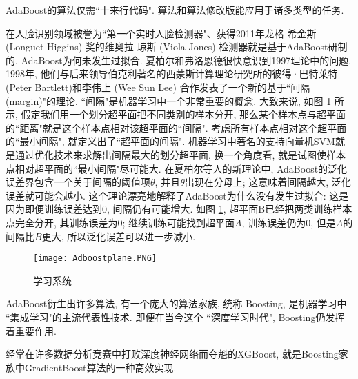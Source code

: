 AdaBoost的算法仅需“十来行代码". 算法和算法修改版能应用于诸多类型的任务.
\begin{example}
在人脸识别领域被誉为“第一个实时人脸检测器"、获得2011年龙格-希金斯 (Longuet-Higgins) 奖的维奥拉-琼斯 (Viola-Jones) 检测器就是基于AdaBoost研制的, AdaBoost为何未发生过拟合. 
夏柏尔和弗洛恩德很快意识到1997理论中的问题. 1998年, 他们与后来领导伯克利著名的西蒙斯计算理论研究所的彼得·巴特莱特 (Peter Bartlett)和李伟上 (Wee Sun Lee) 合作发表了一个新的基于“间隔 (margin)"的理论.
“间隔"是机器学习中一个非常重要的概念. 大致来说, 如图 \ref{AI32Adboostplane} 所示, 假定我们用一个划分超平面把不同类别的样本分开, 那么某个样本点与超平面的“距离"就是这个样本点相对该超平面的“间隔".
考虑所有样本点相对这个超平面的“最小间隔", 就定义出了“超平面的间隔".
机器学习中著名的支持向量机SVM就是通过优化技术来求解出间隔最大的划分超平面, 换一个角度看, 就是试图使样本点相对超平面的“最小间隔"尽可能大.
在夏柏尔等人的新理论中, AdaBoost的泛化误差界包含一个关于间隔的阈值项$\theta$, 并且$\theta$出现在分母上; 这意味着间隔越大, 泛化误差就可能会越小.
这个理论漂亮地解释了AdaBoost为什么没有发生过拟合:
这是因为即便训练误差达到0, 间隔仍有可能增大. 如图 \ref{AI32Adboostplane}, 超平面B已经把两类训练样本点完全分开, 其训练误差为0;
继续训练可能找到超平面$A$, 训练误差仍为0, 但是$A$的间隔比$B$更大, 所以泛化误差可以进一步减小.
\begin{figure}[H]
    \begin{center}
    \texttt{[image: Adboostplane.PNG]}
    \end{center}
    \caption{学习系统}
    \label{AI32Adboostplane}
\end{figure}

AdaBoost衍生出许多算法, 有一个庞大的算法家族, 统称 Boosting, 是机器学习中 ``集成学习"的主流代表性技术. 即便在当今这个 ``深度学习时代", Boosting仍发挥着重要作用. 
\end{example}
\begin{example}
    经常在许多数据分析竞赛中打败深度神经网络而夺魁的XGBoost, 就是Boosting家族中GradientBoost算法的一种高效实现. 
\end{example}

